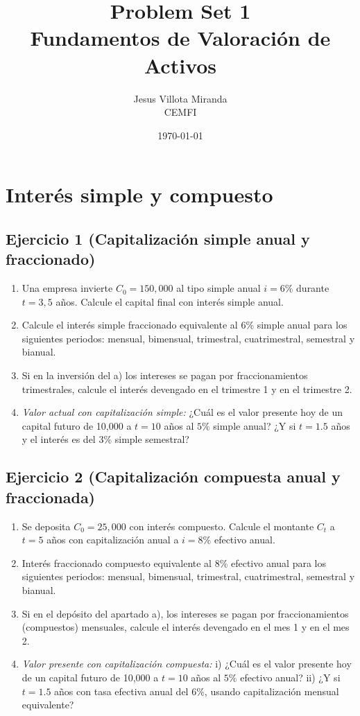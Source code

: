\documentclass[12pt,a4paper]{article}
\title{\textbf{Problem Set 1}\\\large Fundamentos de Valoración de Activos}
\author{Jesus Villota Miranda\\CEMFI}
\date{\today}
\newenvironment{ejercicio}[1]{\subsection*{Ejercicio #1}}{}
\begin{document}
\section{Interés simple y compuesto}

\begin{ejercicio}{1 (Capitalización simple anual y fraccionado)}
\begin{enumerate}[label=\alph*)]
  \item Una empresa invierte $C_0=150{,}000$ al tipo simple anual $i=6\%$ durante $t=3{,}5$ años. Calcule el capital final con interés simple anual.
  \item Calcule el interés simple fraccionado equivalente al 6\% simple anual para los siguientes periodos: mensual, bimensual, trimestral, cuatrimestral, semestral y bianual.
  \item Si en la inversión del a) los intereses se pagan por fraccionamientos trimestrales, calcule el interés devengado en el trimestre 1 y en el trimestre 2.
  \item \textit{Valor actual con capitalización simple:} \; ¿Cuál es el valor presente hoy de un capital futuro de 10{,}000 a $t=10$ años al $5\%$ simple anual? ¿Y si $t=1.5$ años y el interés es del 3\% simple semestral?
\end{enumerate}
\end{ejercicio}

\begin{ejercicio}{2 (Capitalización compuesta anual y fraccionada)}
\begin{enumerate}[label=\alph*)]
  \item Se deposita $C_0=25{,}000$ con interés compuesto. Calcule el montante $C_t$ a $t=5$ años con capitalización anual a $i=8\%$ efectivo anual.
  \item Interés fraccionado compuesto equivalente al 8\% efectivo anual para los siguientes periodos: mensual, bimensual, trimestral, cuatrimestral, semestral y bianual.
  \item Si en el depósito del apartado a), los intereses se pagan por fraccionamientos (compuestos) mensuales, calcule el interés devengado en el mes 1 y en el mes 2.
  \item \textit{Valor presente con capitalización compuesta:} \; i) ¿Cuál es el valor presente hoy de un capital futuro de 10{,}000 a $t=10$ años al $5\%$ efectivo anual? \; ii) ¿Y si $t=1.5$ años con tasa efectiva anual del $6\%$, usando capitalización mensual equivalente?
\end{enumerate}
\end{ejercicio}
\end{document}

